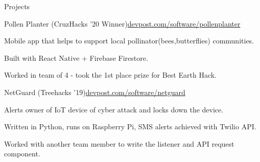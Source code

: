 \documentclass{resume} %
\begin{document}

\begin{rSection}{Projects}

    \begin{rSubsection}{Pollen Planter (CruzHacks '20 Winner)}{\href{https://www.devpost.com/software/pollenplanter}{devpost.com/software/pollenplanter}}{}{}
        \item Mobile app that helps to support local pollinator(bees,butterflies) communities.
        \item Built with React Native + Firebase Firestore.
        \item Worked in team of 4 - took the 1st place prize for Best Earth Hack.
    \end{rSubsection}

    \begin{rSubsection}{NetGuard (Treehacks '19)}{\href{https://www.devpost.com/software/netguard}{devpost.com/software/netguard}}{}{}
        \item Alerts owner of IoT device of cyber attack and locks down the device.
        \item Written in Python, runs on Raspberry Pi, SMS alerts achieved with Twilio API.
        \item Worked with another team member to write the listener and API request component.
    \end{rSubsection}

\end{rSection}






\end{document}
